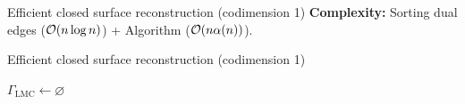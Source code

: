 \begin{frame}[c]{Efficient closed surface reconstruction (codimension 1)}
	\textbf{Complexity:} Sorting dual edges ($\mathcal{O}(n \log n)$) + Algorithm ($\mathcal{O}(n \alpha(n))$).
\end{frame}

\begin{frame}[c]{Efficient closed surface reconstruction (codimension 1)}
	\scriptsize
	\begin{minipage}[c]{0.5\linewidth}
		\begin{algorithm}[H]
			
			$\Gamma_{\operatorname{LMC}} \leftarrow \varnothing$ \\
				 {
			}
			

\end{algorithm}
\end{minipage}
\end{frame}
